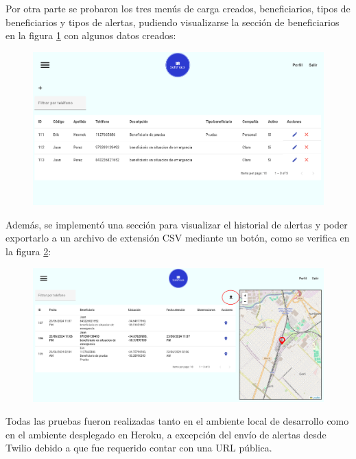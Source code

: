 Por otra parte se probaron los tres menús de carga creados, beneficiarios, tipos de beneficiarios y tipos de alertas, pudiendo visualizarse la sección de beneficiarios en la figura \ref{fig:frontend:beneficiarios} con algunos datos creados:

\begin{figure}[H]
	\centering
  	\includegraphics[width=1\linewidth]{./Figures/listado-beneficiarios.png}
  	\label{fig:frontend:beneficiarios}
\end{figure}
	
Además, se implementó una sección para visualizar el historial de alertas y poder exportarlo a un archivo de extensión CSV mediante un botón, como se verifica en la figura \ref{fig:frontend:alertas}:

\begin{figure}[H]
	\centering
  	\includegraphics[width=1\linewidth]{./Figures/listado-alertas.png}
  	\label{fig:frontend:alertas}
\end{figure}

Todas las pruebas fueron realizadas tanto en el ambiente local de desarrollo como en el ambiente desplegado en Heroku, a excepción del envío de alertas desde Twilio debido a que fue requerido contar con una URL pública.

